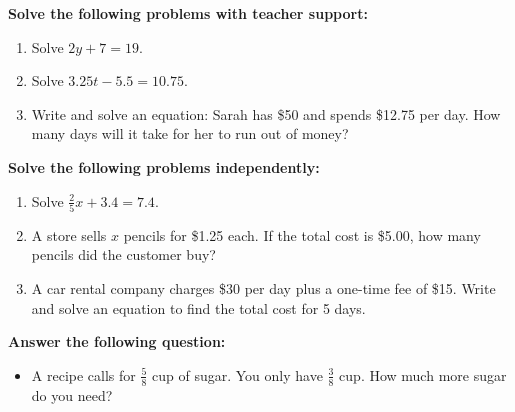 \documentclass[12pt]{article}
\begin{document}
\vspace{1em}

\begin{tcolorbox}[colframe=black!60, colback=white, 
coltitle=black, colbacktitle=black!15, fonttitle=\bfseries\Large, 
title=Guided Practice, halign title=center, left=10pt, right=10pt, top=10pt, bottom=15pt]
\textbf{Solve the following problems with teacher support:}
\begin{enumerate}[itemsep=3em]
    \item Solve \( 2y + 7 = 19 \).
    \item Solve \( 3.25t - 5.5 = 10.75 \).
    \item Write and solve an equation: Sarah has \$50 and spends \$12.75 per day. How many days will it take for her to run out of money?
\end{enumerate}
\end{tcolorbox}

\vspace{1em}

\begin{tcolorbox}[colframe=black!60, colback=white, 
coltitle=black, colbacktitle=black!15, fonttitle=\bfseries\Large, 
title=Independent Practice, halign title=center, left=10pt, right=10pt, top=10pt, bottom=15pt]
\textbf{Solve the following problems independently:}
\begin{enumerate}[itemsep=3em]
    \item Solve \( \frac{2}{5}x + 3.4 = 7.4 \).
    \item A store sells \( x \) pencils for \$1.25 each. If the total cost is \$5.00, how many pencils did the customer buy?
    \item A car rental company charges \$30 per day plus a one-time fee of \$15. Write and solve an equation to find the total cost for 5 days.
\end{enumerate}
\end{tcolorbox}

\vspace{1em}

\begin{tcolorbox}[colframe=black!60, colback=white, 
coltitle=black, colbacktitle=black!15, fonttitle=\bfseries\Large, 
title=Exit Ticket, halign title=center, left=10pt, right=10pt, top=10pt, bottom=15pt]
\textbf{Answer the following question:}
\begin{itemize}
    \item A recipe calls for \( \frac{5}{8} \) cup of sugar. You only have \( \frac{3}{8} \) cup. How much more sugar do you need?
\end{itemize}
\end{tcolorbox}
\end{document}
